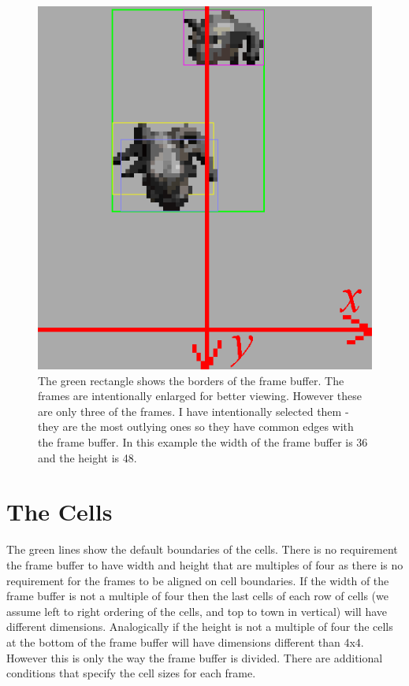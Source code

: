 \begin{figure}[!h]
  \includegraphics[width=\linewidth]{frmbuff.png}
  \caption{
The green rectangle shows the borders of the frame buffer. The frames are 
intentionally enlarged for better viewing. However these are only three of the 
frames. I have intentionally selected them - they are the most outlying ones so 
they have common edges with the frame buffer. In this example the width of the 
frame buffer is 36 and the height is 48.
}
  \label{fig:framebuffer}
\end{figure}


\newpage
\section{The Cells}
The green lines show the default boundaries of the cells. There is no 
requirement the frame buffer to have width and height that are multiples of four 
as there is no requirement for the frames to be aligned on cell boundaries. If 
the width of the frame buffer is not a multiple of four then the last cells of 
each row of cells (we assume left to right ordering of the cells, and top to 
town in vertical) will have different dimensions. Analogically if the height is 
not a multiple of four the cells at the bottom of the frame buffer will have 
dimensions different than 4x4. However this is only the way the frame buffer is 
divided. There are additional conditions that specify the cell sizes for each 
frame.

